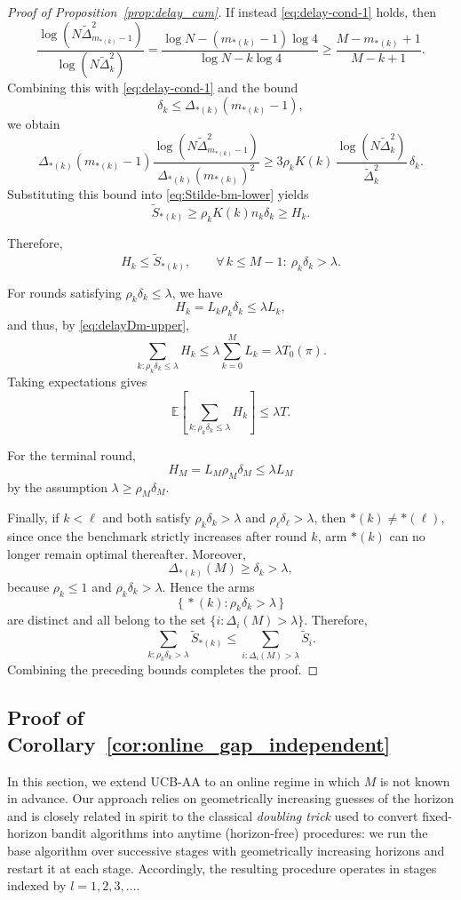 \documentclass[
  12pt]{article}
\begin{document}
\begin{proof}[Proof of Proposition~\ref{prop:delay_cum}]
If instead \eqref{eq:delay-cond-1} holds, then
\[
\frac{\log(N\tilde{\Delta}_{m_{*(k)}-1}^2)}
{\log(N\tilde{\Delta}_k^2)}
=
\frac{\log N-(m_{*(k)}-1)\log 4}{\log N-k\log 4}
\ge
\frac{M-m_{*(k)}+1}{M-k+1}.
\]
Combining this with \eqref{eq:delay-cond-1} and the bound
\[
\delta_k\le \Delta_{*(k)}(m_{*(k)}-1),
\]
we obtain
\[
\Delta_{*(k)}(m_{*(k)}-1)
\frac{\log(N\tilde{\Delta}_{m_{*(k)}-1}^2)}
{\Delta_{*(k)}(m_{*(k)})^2}
\ge
3\rho_k K(k)\,
\frac{\log(N\tilde{\Delta}_k^2)}{\tilde{\Delta}_k^2}\,\delta_k.
\]
Substituting this bound into \eqref{eq:Stilde-bm-lower} yields
\[
\tilde S_{*(k)}
\ge
\rho_k K(k)n_k\delta_k
\ge
H_k.
\]

Therefore,
\[
H_k\le \tilde S_{*(k)},
\qquad
\forall\,k\le M-1:\ \rho_k\delta_k>\lambda.
\]

For rounds satisfying $\rho_k\delta_k\le \lambda$, we have
\[
H_k=L_k\rho_k\delta_k\le \lambda L_k,
\]
and thus, by \eqref{eq:delayDm-upper},
\[
\sum_{k:\rho_k\delta_k\le \lambda}H_k
\le
\lambda\sum_{k=0}^{M}L_k
=
\lambda T_0(\pi).
\]
Taking expectations gives
\[
\mathbb{E}\left[\sum_{k:\rho_k\delta_k\le \lambda}H_k\right]
\le
\lambda T.
\]

For the terminal round,
\[
H_M=L_M\rho_M\delta_M\le \lambda L_M
\]
by the assumption $\lambda\ge \rho_M\delta_M$.

Finally, if $k<\ell$ and both satisfy $\rho_k\delta_k>\lambda$ and $\rho_\ell\delta_\ell>\lambda$,
then $*(k)\neq *(\ell)$, since once the benchmark strictly increases after round $k$, arm $*(k)$
can no longer remain optimal thereafter. Moreover,
\[
\Delta_{*(k)}(M)\ge \delta_k>\lambda,
\]
because $\rho_k\le 1$ and $\rho_k\delta_k>\lambda$. Hence the arms
\[
\{\,*(k):\rho_k\delta_k>\lambda\,\}
\]
are distinct and all belong to the set $\{i:\Delta_i(M)>\lambda\}$. Therefore,
\[
\sum_{k:\rho_k\delta_k>\lambda}\tilde S_{*(k)}
\le
\sum_{i:\Delta_i(M)>\lambda}\tilde S_i.
\]
Combining the preceding bounds completes the proof.
\end{proof}

\subsection{Proof of Corollary~\ref{cor:online_gap_independent}}
\label{sec:Proof of cor:online_gap_independent}

In this section, we extend UCB-AA to an online regime in which $M$ is not known in advance. Our approach relies on geometrically increasing guesses of the horizon and is closely related in spirit to the classical \emph{doubling trick} used to convert fixed-horizon bandit algorithms into anytime (horizon-free) procedures: we run the base algorithm over successive stages with geometrically increasing horizons and restart it at each stage. Accordingly, the resulting procedure operates in stages indexed by $l=1, 2, 3, \ldots$.
\end{document}
